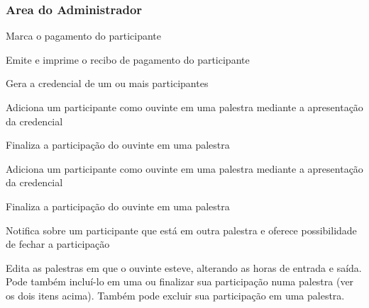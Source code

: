 \documentclass[12pt,a4paper]{article}
\begin{document}
			\clearpage
			\subsubsection{Area do Administrador}
			
        	{Marca o pagamento do participante}
        	{%
        	
        	}
			
        	{Emite e imprime o recibo de pagamento do participante}
        	{%
        	
        	}
			
        	{Gera a credencial de um ou mais participantes}
        	{%
        	
        	}
			
        	{Adiciona um participante como ouvinte em uma palestra mediante a apresentação da credencial}
        	{%
        	
        	}
        	{Finaliza a participação do ouvinte em uma palestra}
        	{%
        	
        	}
			
        	{Adiciona um participante como ouvinte em uma palestra mediante a apresentação da credencial}
        	{%
        	
        	}
			
        	{Finaliza a participação do ouvinte em uma palestra}
        	{%
        	
        	}
			
        	{Notifica sobre um participante que está em outra palestra e oferece possibilidade de fechar a participação}
        	{%
        	
        	}
			
        	{Edita as palestras em que o ouvinte esteve, alterando as horas de entrada e saída. Pode também incluí-lo em uma ou finalizar sua participação numa palestra (ver os dois itens acima). Também pode excluir sua participação em uma palestra.}
        	{%
        	
        	}
						
\end{document}

